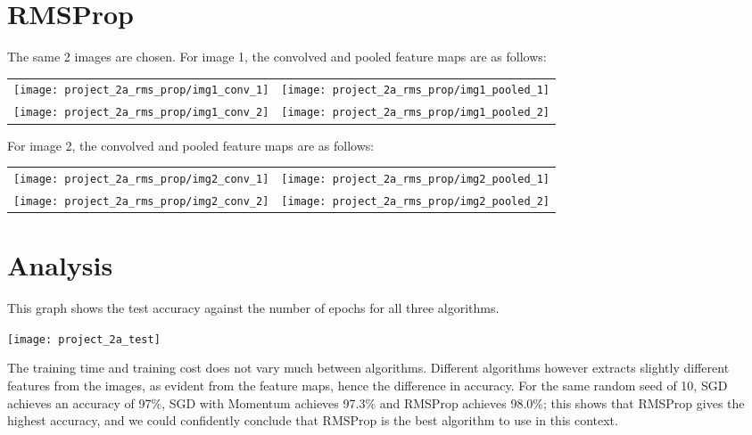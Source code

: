 \section*{RMSProp}

The same 2 images are chosen.
For image 1, the convolved and pooled feature maps are as follows:

\begin{longtabu}{X[c]X[c]}
    \texttt{[image: project\_2a\_rms\_prop/img1\_conv\_1]} &
    \texttt{[image: project\_2a\_rms\_prop/img1\_pooled\_1]} \\
    \texttt{[image: project\_2a\_rms\_prop/img1\_conv\_2]} &
    \texttt{[image: project\_2a\_rms\_prop/img1\_pooled\_2]}
\end{longtabu}

For image 2, the convolved and pooled feature maps are as follows:

\begin{longtabu}{X[c]X[c]}
    \texttt{[image: project\_2a\_rms\_prop/img2\_conv\_1]} &
    \texttt{[image: project\_2a\_rms\_prop/img2\_pooled\_1]} \\
    \texttt{[image: project\_2a\_rms\_prop/img2\_conv\_2]} &
    \texttt{[image: project\_2a\_rms\_prop/img2\_pooled\_2]}
\end{longtabu}

\section*{Analysis}

This graph shows the test accuracy against the number of epochs for
all three algorithms.

\begin{center}
    \texttt{[image: project\_2a\_test]}
\end{center}

The training time and training cost does not vary much between algorithms.
Different algorithms however extracts slightly different features from the
images, as evident from the feature maps, hence the difference in accuracy.
For the same random seed of 10, SGD achieves an accuracy of 97\%, SGD with
Momentum achieves 97.3\% and RMSProp achieves 98.0\%; this shows that
RMSProp gives the highest accuracy, and we could confidently conclude that
RMSProp is the best algorithm to use in this context.
